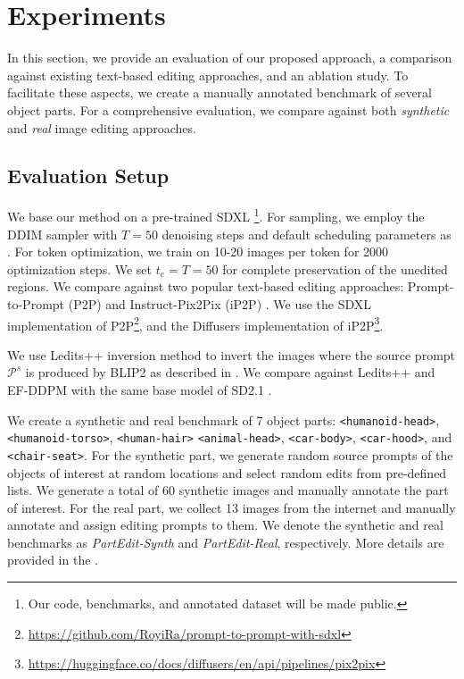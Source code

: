 
\section{Experiments}
\label{sec:exp}


In this section, we provide an evaluation of our proposed approach, a comparison against existing text-based editing approaches, and an ablation study.
To facilitate these aspects, we create a manually annotated benchmark of several object parts.
For a comprehensive evaluation, we compare against both \emph{synthetic} and \emph{real} image editing approaches.

\subsection{Evaluation Setup}
\renewcommand{\thefootnote}{\arabic{footnote}}

We base our method on a pre-trained SDXL \citep{podell2024sdxl} 
\footnote{Our code, benchmarks, and annotated dataset will be made public.
}.
For sampling, we employ the DDIM sampler \citep{ddim} with $T=50$ denoising steps and default scheduling parameters as \citep{hertz2022prompt}.
For token optimization, we train on 10-20 images per token for 2000 optimization steps.
We set $t_e=T=50$ for complete preservation of the unedited regions.
We compare against two popular text-based editing approaches: Prompt-to-Prompt (P2P) \citep{hertz2022prompt} and Instruct-Pix2Pix (iP2P) \citep{brooks2023instructpix2pix}.
We use the SDXL implementation of P2P\footnote{\url{https://github.com/RoyiRa/prompt-to-prompt-with-sdxl}}, and the Diffusers implementation of iP2P\footnote{\url{https://huggingface.co/docs/diffusers/en/api/pipelines/pix2pix}}.


We use Ledits++ \citep{brack2024ledits} inversion method to invert the images where the source prompt $\mathcal{P}^s$ is produced by BLIP2 \citep{li2023blip} as described in .
We compare against Ledits++ and EF-DDPM \citep{huberman2024edit} with the same base model of SD2.1 \citep{sd}.


We create a synthetic and real benchmark of 7 object parts: \texttt{<humanoid-head>}, \texttt{<humanoid-torso>}, \texttt{<human-hair>} \texttt{<animal-head>}, \texttt{<car-body>}, \texttt{<car-hood>}, and \texttt{<chair-seat>}. 
For the synthetic part, we generate random source prompts of the objects of interest at random locations and select random edits from pre-defined lists.
We generate a total of 60 synthetic images and manually annotate the part of interest.
For the real part, we collect 13 images from the internet and manually annotate and assign editing prompts to them.
We denote the synthetic and real benchmarks as \emph{PartEdit-Synth} and \emph{PartEdit-Real}, respectively.
More details are provided in the .



